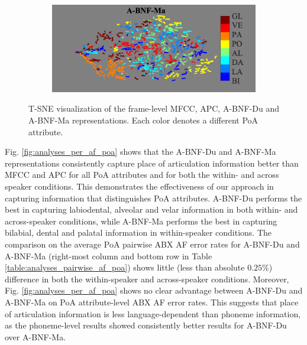 \documentclass[transmag]{IEEEtran}
\begin{document}
\begin{figure}[!t]
\begin{subfigure}{0.49\linewidth}
	   \centering
	   \includegraphics[width=1\linewidth]{tsne_af_poa_bnf_aidatatang_apc_input_disc_bar_adjust_journal.png}
    \end{subfigure}
    \caption{T-SNE visualization of the frame-level  MFCC, APC, A-BNF-Du and A-BNF-Ma representations. Each color denotes a different PoA attribute.}
    \label{fig:analysis_tsne_poa}

\end{figure}

Fig. \ref{fig:analyses_per_af_poa} shows that the A-BNF-Du and A-BNF-Ma representations consistently capture place of articulation information better than MFCC and APC for all PoA attributes and for both the within- and across speaker conditions. This demonstrates the effectiveness of our approach in capturing information that distinguishes PoA attributes. A-BNF-Du performs the best in capturing labiodental, alveolar and velar information in both within- and across-speaker conditions, while A-BNF-Ma performs the best in capturing bilabial, dental and palatal information in within-speaker conditions.
The comparison on the average PoA pairwise ABX AF error rates for A-BNF-Du and A-BNF-Ma (right-most column and bottom row in Table \ref{table:analyses_pairwise_af_poa}) shows little (less than absolute $0.25\%$) difference in both the within-speaker and across-speaker conditions. Moreover, Fig. \ref{fig:analyses_per_af_poa} shows no clear advantage between A-BNF-Du and A-BNF-Ma on PoA attribute-level ABX AF error rates.  This suggests that place of articulation information is less language-dependent than phoneme information, as the phoneme-level results showed consistently better results for A-BNF-Du over A-BNF-Ma.

\end{document}
